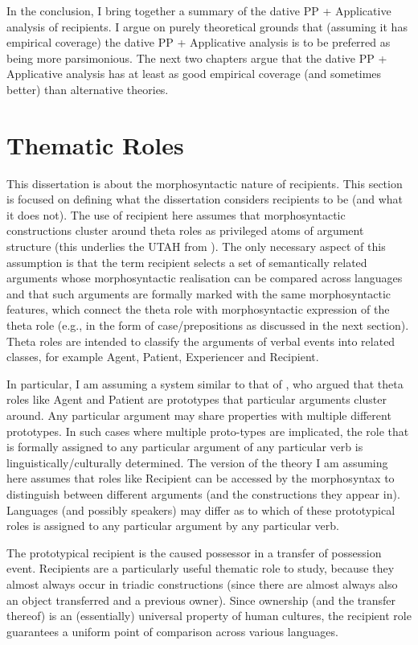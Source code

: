 In the conclusion, I bring together a summary of the dative PP + Applicative analysis of recipients. I argue on purely theoretical grounds that (assuming it has empirical coverage) the dative PP + Applicative analysis is to be preferred as being more parsimonious. The next two chapters argue that the dative PP + Applicative analysis has at least as good empirical coverage (and sometimes better) than alternative theories.

\section{Thematic Roles}
This dissertation is about the morphosyntactic nature of recipients. This section is focused on defining what the dissertation considers recipients to be (and what it does not). The use of recipient here assumes that morphosyntactic constructions cluster around theta roles as privileged atoms of argument structure (this underlies the UTAH from \citealt{Baker.1988}). The only necessary aspect of this assumption is that the term recipient selects a set of semantically related arguments whose morphosyntactic realisation can be compared across languages and that such arguments are formally marked with the same morphosyntactic features, which connect the theta role with morphosyntactic expression of the theta role (e.g., in the form of case/prepositions as discussed in the next section). Theta roles are intended to classify the arguments of verbal events into related classes, for example Agent, Patient, Experiencer and Recipient. 

In particular, I am assuming a system similar to that of \cite{Dowty.1991}, who argued that theta roles like Agent and Patient are prototypes that particular arguments cluster around. Any particular argument may share properties with multiple different prototypes. In such cases where multiple proto-types are implicated, the role that is formally assigned to any particular argument of any particular verb is linguistically/culturally determined. The version of the theory I am assuming here assumes that roles like Recipient can be accessed by the morphosyntax to distinguish between different arguments (and the constructions they appear in). Languages (and possibly speakers) may differ as to which of these prototypical roles is assigned to any particular argument by any particular verb.

The prototypical recipient is the caused possessor in a transfer of possession event. Recipients are a particularly useful thematic role to study, because they almost always occur in triadic constructions (since there are almost always also an object transferred and a previous owner). Since ownership (and the transfer thereof) is an (essentially) universal property of human cultures, the recipient role guarantees a uniform point of comparison across various languages. 

